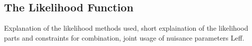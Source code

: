 \subsection{The Likelihood Function}
Explanation of the likelihood methods used, short explaination of the likelihood parts and constraints for combination, joint usage of nuisance parameters {Leff}.

